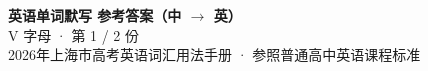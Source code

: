 \documentclass[10pt,a4paper]{article}
\begin{document}
\pagestyle{plain}

\begin{center}
{\LARGE\bfseries 英语单词默写 \quad 参考答案（中 $\to$ 英）}\\[0.22em]
{\large V 字母 · 第 1 / 2 份}\\[0.18em]
{\small 2026年上海市高考英语词汇用法手册 · 参照普通高中英语课程标准}
\end{center}

\vspace{0.2em}
\noindent{\color{rulegray}\rule{\textwidth}{0.8pt}}

\vspace{0.35em}

\vspace{0.25em}
\renewcommand{\arraystretch}{1.32}
\end{document}

